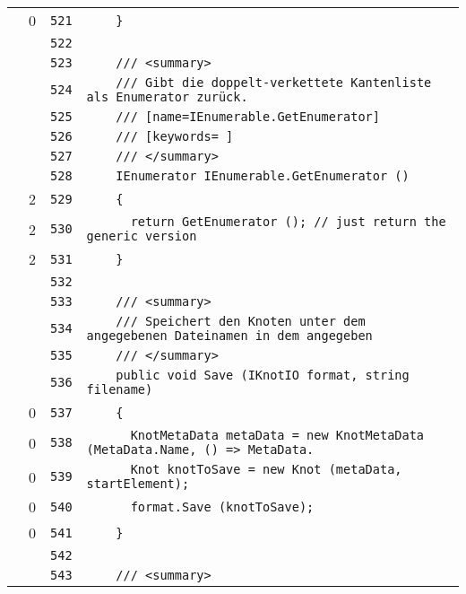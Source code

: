 \documentclass[a4paper,10pt]{article}
\begin{document}
\begin{longtable}[l]{lrrl}
\cellcolor{red} & 0 & \verb~521~ & \verb~    }~\\
\cellcolor{gray} &  & \verb~522~ & \verb~~\\
\cellcolor{gray} &  & \verb~523~ & \verb~    /// <summary>~\\
\cellcolor{gray} &  & \verb~524~ & \verb~    /// Gibt die doppelt-verkettete Kantenliste als Enumerator zurück.~\\
\cellcolor{gray} &  & \verb~525~ & \verb~    /// [name=IEnumerable.GetEnumerator]~\\
\cellcolor{gray} &  & \verb~526~ & \verb~    /// [keywords= ]~\\
\cellcolor{gray} &  & \verb~527~ & \verb~    /// </summary>~\\
\cellcolor{gray} &  & \verb~528~ & \verb~    IEnumerator IEnumerable.GetEnumerator ()~\\
\cellcolor{green} & 2 & \verb~529~ & \verb~    {~\\
\cellcolor{green} & 2 & \verb~530~ & \verb~      return GetEnumerator (); // just return the generic version~\\
\cellcolor{green} & 2 & \verb~531~ & \verb~    }~\\
\cellcolor{gray} &  & \verb~532~ & \verb~~\\
\cellcolor{gray} &  & \verb~533~ & \verb~    /// <summary>~\\
\cellcolor{gray} &  & \verb~534~ & \verb~    /// Speichert den Knoten unter dem angegebenen Dateinamen in dem angegeben~\\
\cellcolor{gray} &  & \verb~535~ & \verb~    /// </summary>~\\
\cellcolor{gray} &  & \verb~536~ & \verb~    public void Save (IKnotIO format, string filename)~\\
\cellcolor{red} & 0 & \verb~537~ & \verb~    {~\\
\cellcolor{red} & 0 & \verb~538~ & \verb~      KnotMetaData metaData = new KnotMetaData (MetaData.Name, () => MetaData.~\\
\cellcolor{red} & 0 & \verb~539~ & \verb~      Knot knotToSave = new Knot (metaData, startElement);~\\
\cellcolor{red} & 0 & \verb~540~ & \verb~      format.Save (knotToSave);~\\
\cellcolor{red} & 0 & \verb~541~ & \verb~    }~\\
\cellcolor{gray} &  & \verb~542~ & \verb~~\\
\cellcolor{gray} &  & \verb~543~ & \verb~    /// <summary>~\\

\end{longtable}
\end{document}
